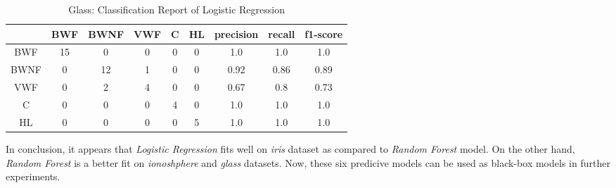 \documentclass[english]{tktltiki2}
\theoremstyle{definition}
\theoremstyle{remark}
\begin{document}
\begin{table}[H]
	\begin{center}
		\caption{Glass: Classification Report of Logistic Regression}
		\label{table:lr_model_glass_report}
		\begin{tabular}{@{}ccccccccc@{}}
			\toprule
			& BWF & BWNF & VWF & C & HL & precision & recall & f1-score \\ \hline
			\multicolumn{1}{|c|}{BWF} & \multicolumn{1}{c|}{15} & \multicolumn{1}{c|}{0} & \multicolumn{1}{c|}{0} & \multicolumn{1}{c|}{0} & \multicolumn{1}{c|}{0} & \multicolumn{1}{c|}{1.0} & \multicolumn{1}{c|}{1.0} & \multicolumn{1}{c|}{1.0} \\ \hline
			
			\multicolumn{1}{|c|}{BWNF} & \multicolumn{1}{c|}{0} & \multicolumn{1}{c|}{12} & \multicolumn{1}{c|}{1} & \multicolumn{1}{c|}{0} & \multicolumn{1}{c|}{0} & \multicolumn{1}{c|}{0.92} & \multicolumn{1}{c|}{0.86} & \multicolumn{1}{c|}{0.89} \\ \hline
			
			\multicolumn{1}{|c|}{VWF} & \multicolumn{1}{c|}{0} & \multicolumn{1}{c|}{2} & \multicolumn{1}{c|}{4} & \multicolumn{1}{c|}{0} & \multicolumn{1}{c|}{0} & \multicolumn{1}{c|}{0.67} & \multicolumn{1}{c|}{0.8} & \multicolumn{1}{c|}{0.73} \\ \hline
			
			\multicolumn{1}{|c|}{C} & \multicolumn{1}{c|}{0} & \multicolumn{1}{c|}{0} & \multicolumn{1}{c|}{0} & \multicolumn{1}{c|}{4} & \multicolumn{1}{c|}{0} & \multicolumn{1}{c|}{1.0} & \multicolumn{1}{c|}{1.0} & \multicolumn{1}{c|}{1.0} \\ \hline
			
			\multicolumn{1}{|c|}{HL} & \multicolumn{1}{c|}{0} & \multicolumn{1}{c|}{0} & \multicolumn{1}{c|}{0} & \multicolumn{1}{c|}{0} & \multicolumn{1}{c|}{5} & \multicolumn{1}{c|}{1.0} & \multicolumn{1}{c|}{1.0} & \multicolumn{1}{c|}{1.0} \\ \hline
		\end{tabular}
	\end{center}
\end{table}

In conclusion, it appears that \textit{Logistic Regression} fits well on \textit{iris} dataset as compared to \textit{Random Forest} model. On the other hand, \textit{Random Forest} is a better fit on \textit{ionoshphere} and \textit{glass} datasets. Now, these six predicive models can be used as black-box models in further experiments.
\end{document}
